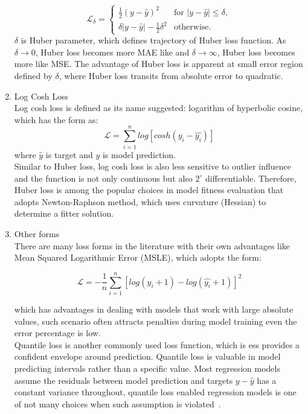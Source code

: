 \begin{enumerate}
\begin{equation}
    \mathcal{L}_\delta = \left\{ 
    \begin{array}{ll}
        \frac {1}{2} (y - \hat{y})^2 & \text{for } |y-\hat{y}| \leq \delta, \\
        \delta |y - \hat{y}| - \frac{1}{2} \delta^2 & \text{otherwise.} 
    \end{array}\right.
\end{equation}
$\delta$ is Huber parameter, which defines trajectory of Huber loss function. As $\delta \rightarrow 0$, Huber loss becomes more MAE like and $\delta \rightarrow \infty$, Huber loss becomes more like MSE. The advantage of Huber loss is apparent at small error region defined by $\delta$, where Huber loss transits from absolute error to quadratic. 
    \item Log Cosh Loss \\
Log cosh loss is defined as its name suggested: logarithm of hyperbolic cosine, which has the form as:
\begin{equation}
    \mathcal{L} = \sum_{i=1}^n log[cosh(y_i-\hat{y_i})]
\end{equation}
where $\hat{y}$ is target and $y$ is model prediction. \\
Similar to Huber loss, log cosh loss is also less sensitive to outlier influence and the function is not only continuous but also $2^{\circ}$ differentiable. Therefore, Huber loss is among the popular choices in model fitness evaluation that adopts Newton-Raphson method, which uses curvature (Hessian) to determine a fitter solution. 
    \item Other forms\\
There are many loss forms in the literature with their own advantages like Mean Squared Logarithmic Error (MSLE), which adopts the form:

\begin{equation}
    \mathcal{L} = -\frac{1}{n}\sum_{i=1}^n [log (y_i + 1) -  log(\hat{y_i} + 1) ]^2 
\end{equation}

which has advantages in dealing with models that work with large absolute values, such scenario often attracts penalties during model training even the error percentage is low. \\
Quantile loss is another commonly used loss function, which is ess provides a confident envelope around prediction. Quantile loss is valuable in model predicting intervals rather than a specific value. Most regression models assume the residuals between model prediction and targets $y-\hat{y}$ has a constant variance throughout, quantile loss enabled regression models is one of not many choices when such assumption is violated~\cite{2019arXiv190107874T}.
\end{enumerate}